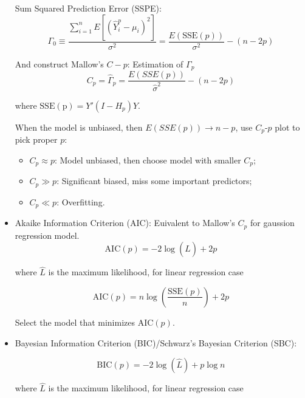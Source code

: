 \begin{itemize}[topsep=2pt,itemsep=2pt]
        Sum Squared Prediction Error (SSPE):
        \begin{equation}
            \Gamma _0\equiv \dfrac{\sum_{i=1}^n E[(\hat{Y}_i^p-\mu_i)^2]}{\sigma ^2}=\dfrac{E(\mathrm{SSE}(p) )}{\sigma ^2}-(n-2p)
        \end{equation}
        
        And construct Mallow's $ C-p $: Estimation of $ \Gamma _p $
        \begin{equation}\label{EqaMallowsCp}
            C_p=\hat{\Gamma }_p=\dfrac{E(SSE(p))}{\hat{\sigma }^2}-(n-2p)
        \end{equation}

        where $ \mathrm{SSE(p)}=Y'(I-H_p)Y  $.
        
        When the model is unbiased, then $ E(SSE(p))\to n-p $, use $ C_p$-$p $ plot to pick proper $ p $: 
        \begin{itemize}[topsep=2pt,itemsep=0pt]
            \item $ C_p\approx p $: Model unbiased, then choose model with smaller $ C_p $;
            \item $ C_p\gg p $: Significant biased, miss some important predictors;
            \item $ C_p\ll p $: Overfitting.
        \end{itemize}
        

        \item Akaike Information Criterion (AIC): Euivalent to Mallow's $ C_p $ for gaussion regression model.
        \[
            \mathrm{AIC}(p)=-2\log(\hat{L})+2p 
        \]

        where $ \hat{L} $ is the maximum likelihood, for linear regression case 
        
        \[
            \mathrm{AIC}(p)=n\log\left(\dfrac{\mathrm{SSE}(p) }{n}\right)+2p 
        \]

        Select the model that minimizes $ \mathrm{AIC}(p) $.
        \item Bayesian Information Criterion (BIC)/Schwarz's Bayesian Criterion (SBC):
        
        \[
            \mathrm{BIC}(p)=-2\log(\hat{L})+p\log n 
        \]
        
        where $ \hat{L} $ is the maximum likelihood, for linear regression case 
        

\end{itemize}
